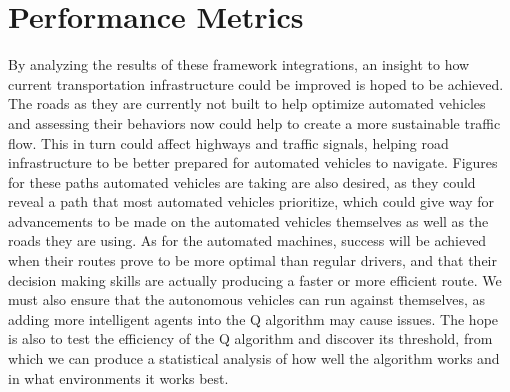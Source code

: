 \documentclass[letterpaper,10pt,draftclsnofoot,onecolumn]{IEEEtran} %
\begin{document}
\section{Performance Metrics}
By analyzing the results of these framework integrations, an insight to how current transportation infrastructure could be improved is hoped to be achieved. The roads as they are currently not built to help optimize automated vehicles and assessing their behaviors now could help to create a more sustainable traffic flow. This in turn could affect highways and traffic signals, helping road infrastructure to be better prepared for automated vehicles to navigate. Figures for these paths automated vehicles are taking are also desired, as they could reveal a path that most automated vehicles prioritize, which could give way for advancements to be made on the automated vehicles themselves as well as the roads they are using. As for the automated machines, success will be achieved when their routes prove to be more optimal than regular drivers, and that their decision making skills are actually producing a faster or more efficient route. We must also ensure that the autonomous vehicles can run against themselves, as adding more intelligent agents into the Q algorithm may cause issues. The hope is also to test the efficiency of the Q algorithm and discover its threshold, from which we can produce a statistical analysis of how well the algorithm works and in what environments it works best.
\end{document}
